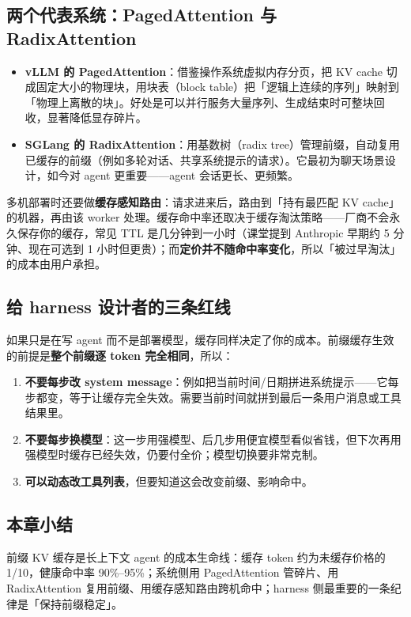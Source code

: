 \documentclass[a4paper]{article}
\begin{document}
\subsection{两个代表系统：PagedAttention 与 RadixAttention}

\begin{itemize}
\item \textbf{vLLM 的 PagedAttention}：借鉴操作系统虚拟内存分页，把 KV cache 切成固定大小的物理块，用块表（block table）把「逻辑上连续的序列」映射到「物理上离散的块」。好处是可以并行服务大量序列、生成结束时可整块回收，显著降低显存碎片。
\item \textbf{SGLang 的 RadixAttention}：用基数树（radix tree）管理前缀，自动复用已缓存的前缀（例如多轮对话、共享系统提示的请求）。它最初为聊天场景设计，如今对 agent 更重要——agent 会话更长、更频繁。
\end{itemize}

多机部署时还要做\textbf{缓存感知路由}：请求进来后，路由到「持有最匹配 KV cache」的机器，再由该 worker 处理。缓存命中率还取决于缓存淘汰策略——厂商不会永久保存你的缓存，常见 TTL 是几分钟到一小时（课堂提到 Anthropic 早期约 5 分钟、现在可选到 1 小时但更贵）；而\textbf{定价并不随命中率变化}，所以「被过早淘汰」的成本由用户承担。

\subsection{给 harness 设计者的三条红线}

如果只是在写 agent 而不是部署模型，缓存同样决定了你的成本。前缀缓存生效的前提是\textbf{整个前缀逐 token 完全相同}，所以：

\begin{enumerate}
\item \textbf{不要每步改 system message}：例如把当前时间/日期拼进系统提示——它每步都变，等于让缓存完全失效。需要当前时间就拼到最后一条用户消息或工具结果里。
\item \textbf{不要每步换模型}：这一步用强模型、后几步用便宜模型看似省钱，但下次再用强模型时缓存已经失效，仍要付全价；模型切换要非常克制。
\item \textbf{可以动态改工具列表}，但要知道这会改变前缀、影响命中。
\end{enumerate}

\subsection{本章小结}
前缀 KV 缓存是长上下文 agent 的成本生命线：缓存 token 约为未缓存价格的 1/10，健康命中率 90\%--95\%；系统侧用 PagedAttention 管碎片、用 RadixAttention 复用前缀、用缓存感知路由跨机命中；harness 侧最重要的一条纪律是「保持前缀稳定」。
\end{document}
